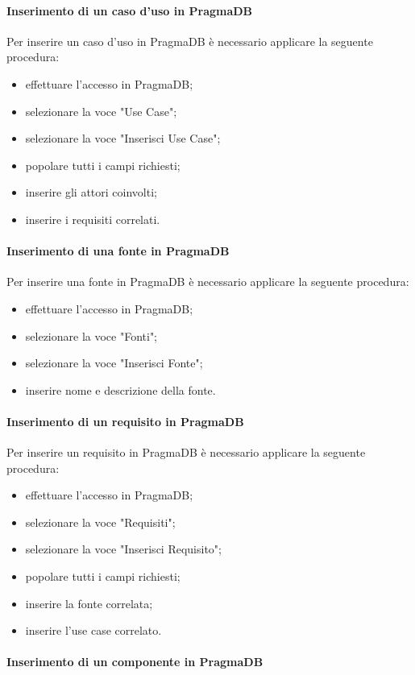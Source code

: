  \paragraph{Inserimento di un caso d'uso in PragmaDB}
 Per inserire un caso d'uso in PragmaDB è necessario applicare la seguente procedura:
 \begin{itemize}
 	\item effettuare l'accesso in PragmaDB;
 	\item selezionare la voce "Use Case";
 	\item selezionare la voce "Inserisci Use Case";
 	\item popolare tutti i campi richiesti;
 	\item inserire gli attori coinvolti;
 	\item inserire i requisiti correlati.
 \end{itemize}
 \paragraph{Inserimento di una fonte in PragmaDB}
 Per inserire una fonte in PragmaDB è necessario applicare la seguente procedura:
 \begin{itemize}
 	\item effettuare l'accesso in PragmaDB;
 	\item selezionare la voce "Fonti";
 	\item selezionare la voce "Inserisci Fonte";
 	\item inserire nome e descrizione della fonte.
 \end{itemize}
 \paragraph{Inserimento di un requisito in PragmaDB}
 Per inserire un requisito in PragmaDB è necessario applicare la seguente procedura:
 \begin{itemize}
 	\item effettuare l'accesso in PragmaDB;
 	\item selezionare la voce "Requisiti";
 	\item selezionare la voce "Inserisci Requisito";
 	\item popolare tutti i campi richiesti;
 	\item inserire la fonte correlata;
 	\item inserire l'use case correlato.
 \end{itemize}
 \paragraph{Inserimento di un componente in PragmaDB}
